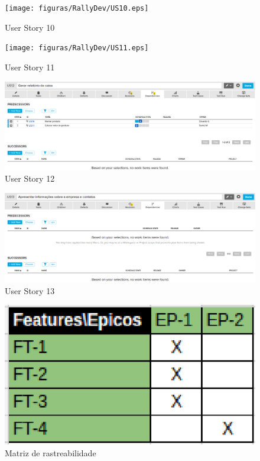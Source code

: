 \begin{figure}[h]
    \centering
    \label{fig01}
        \texttt{[image: figuras/RallyDev/US10.eps]}
    \caption{User Story 10}
\end{figure}

\begin{figure}[h]
    \centering
    \label{fig01}
        \texttt{[image: figuras/RallyDev/US11.eps]}
    \caption{User Story 11}
\end{figure}

\begin{figure}[h]
    \centering
    \label{fig01}
        \includegraphics[keepaspectratio=true,scale=0.3]{figuras/RallyDev/US12.eps}
    \caption{User Story 12}
\end{figure}

\begin{figure}[h]
    \centering
    \label{fig01}
        \includegraphics[keepaspectratio=true,scale=0.3]{figuras/RallyDev/US13.eps}
    \caption{User Story 13}
\end{figure}

\begin{figure}[h]
    \centering
    \label{fig01}
        \includegraphics[keepaspectratio=true,scale=1]{figuras/RallyDev/matriz.eps}
    \caption{Matriz de rastreabilidade}
\end{figure}

